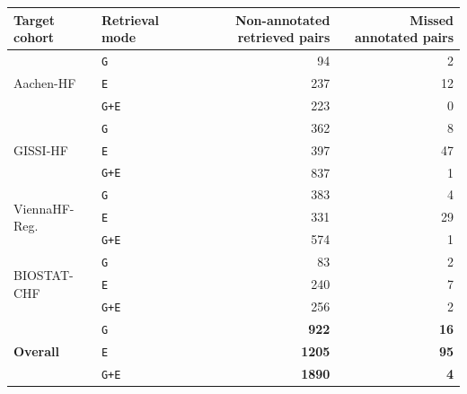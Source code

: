 \begin{tabular}{llrr}
\toprule
\textbf{Target cohort} & \textbf{Retrieval mode} & \textbf{Non-annotated retrieved pairs} & \textbf{Missed annotated pairs} \\
\midrule
\multirow{3}{*}{Aachen-HF} & \texttt{G} & 94 & 2 \\
 & \texttt{E} & 237 & 12 \\
 & \texttt{G+E} & 223 & 0 \\
\midrule
\multirow{3}{*}{GISSI-HF} & \texttt{G} & 362 & 8 \\
 & \texttt{E} & 397 & 47 \\
 & \texttt{G+E} & 837 & 1 \\
\midrule
\multirow{3}{*}{ViennaHF-Reg.} & \texttt{G} & 383 & 4 \\
 & \texttt{E} & 331 & 29 \\
 & \texttt{G+E} & 574 & 1 \\
\midrule
\multirow{3}{*}{BIOSTAT-CHF} & \texttt{G} & 83 & 2 \\
 & \texttt{E} & 240 & 7 \\
 & \texttt{G+E} & 256 & 2 \\
\midrule
\multirow{3}{*}{\textbf{Overall}} & \texttt{G} & \textbf{922} & \textbf{16} \\
 & \texttt{E} & \textbf{1205} & \textbf{95} \\
 & \texttt{G+E} & \textbf{1890} & \textbf{4} \\
\bottomrule
\end{tabular}
